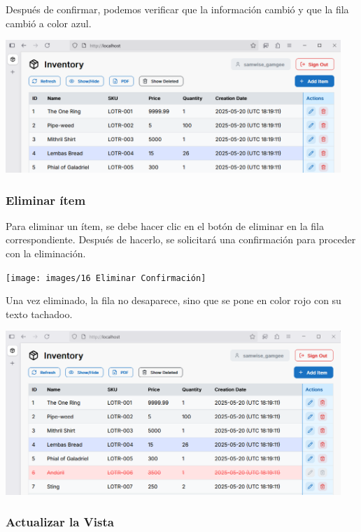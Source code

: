 Después de confirmar, podemos verificar que la información cambió y que la fila cambió a color azul.

\begin{center}
\includegraphics[width=0.95\textwidth]{images/15 Fila Editada}
\end{center}

\subsubsection{Eliminar ítem}

Para eliminar un ítem, se debe hacer clic en el botón de eliminar en la fila correspondiente. Después de hacerlo, se solicitará una confirmación para proceder con la eliminación.

\begin{center}
\texttt{[image: images/16 Eliminar Confirmación]}
\end{center}

Una vez eliminado, la fila no desaparece, sino que se pone en color rojo con su texto tachadoo.

\begin{center}
\includegraphics[width=0.95\textwidth]{images/17 Fila Eliminada}
\end{center}

\subsubsection{Actualizar la Vista}

